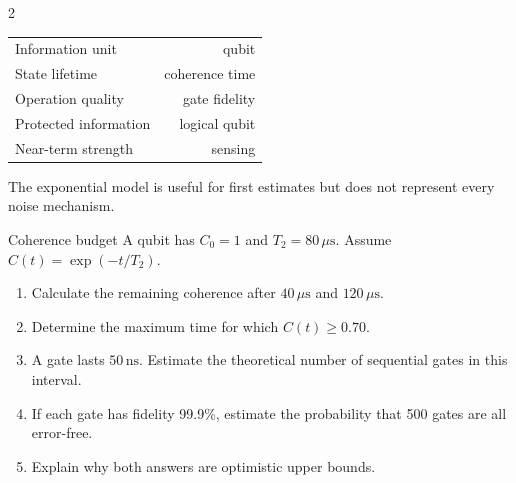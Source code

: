 \begin{multicols}{2}
\begin{keyfigures}
\begin{tabularx}{\linewidth}{@{}Xr@{}}
Information unit & qubit\\
State lifetime & coherence time\\
Operation quality & gate fidelity\\
Protected information & logical qubit\\
Near-term strength & sensing
\end{tabularx}
\end{keyfigures}

\begin{tcolorbox}[title=\sffamily\bfseries Illustrative coherence decay,colback=white,colframe=ECPurple]
\begin{center}
\end{center}
\footnotesize The exponential model is useful for first estimates but does not represent every noise mechanism.
\end{tcolorbox}

\begin{applicationexercise}{Coherence budget}
A qubit has $C_0=1$ and $T_2=80\,\mu\mathrm{s}$. Assume $C(t)=\exp(-t/T_2)$.
\begin{enumerate}
\item Calculate the remaining coherence after $40\,\mu\mathrm{s}$ and $120\,\mu\mathrm{s}$.
\item Determine the maximum time for which $C(t)\geq0.70$.
\item A gate lasts $50\,\mathrm{ns}$. Estimate the theoretical number of sequential gates in this interval.
\item If each gate has fidelity 99.9\%, estimate the probability that 500 gates are all error-free.
\item Explain why both answers are optimistic upper bounds.
\end{enumerate}
\end{applicationexercise}


\end{multicols}
